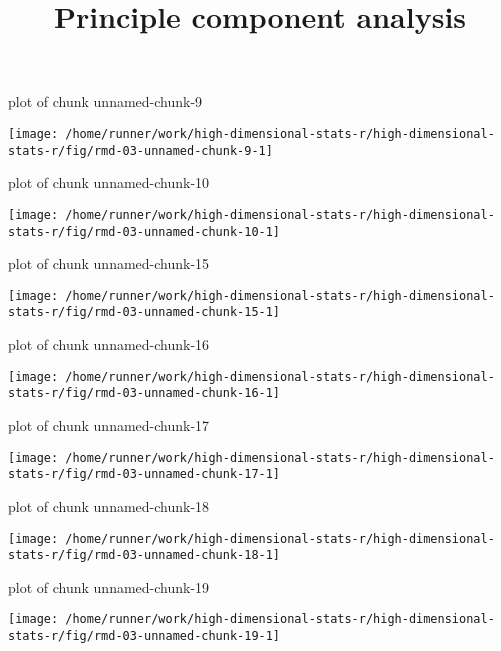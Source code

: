 \documentclass[ignorenonframetext,]{beamer}
\title{Principle component analysis}
\author{}
\date{\vspace{-2.5em}}
\begin{document}
\frame{\titlepage}

\begin{frame}{plot of chunk unnamed-chunk-9}
\protect\hypertarget{plot-of-chunk-unnamed-chunk-9}{}

\texttt{[image: /home/runner/work/high-dimensional-stats-r/high-dimensional-stats-r/fig/rmd-03-unnamed-chunk-9-1]}



\end{frame}

\begin{frame}{plot of chunk unnamed-chunk-10}
\protect\hypertarget{plot-of-chunk-unnamed-chunk-10}{}

\texttt{[image: /home/runner/work/high-dimensional-stats-r/high-dimensional-stats-r/fig/rmd-03-unnamed-chunk-10-1]}



\end{frame}

\begin{frame}{plot of chunk unnamed-chunk-15}
\protect\hypertarget{plot-of-chunk-unnamed-chunk-15}{}

\texttt{[image: /home/runner/work/high-dimensional-stats-r/high-dimensional-stats-r/fig/rmd-03-unnamed-chunk-15-1]}



\end{frame}

\begin{frame}{plot of chunk unnamed-chunk-16}
\protect\hypertarget{plot-of-chunk-unnamed-chunk-16}{}

\texttt{[image: /home/runner/work/high-dimensional-stats-r/high-dimensional-stats-r/fig/rmd-03-unnamed-chunk-16-1]}



\end{frame}

\begin{frame}{plot of chunk unnamed-chunk-17}
\protect\hypertarget{plot-of-chunk-unnamed-chunk-17}{}

\texttt{[image: /home/runner/work/high-dimensional-stats-r/high-dimensional-stats-r/fig/rmd-03-unnamed-chunk-17-1]}



\end{frame}

\begin{frame}{plot of chunk unnamed-chunk-18}
\protect\hypertarget{plot-of-chunk-unnamed-chunk-18}{}

\texttt{[image: /home/runner/work/high-dimensional-stats-r/high-dimensional-stats-r/fig/rmd-03-unnamed-chunk-18-1]}



\end{frame}

\begin{frame}{plot of chunk unnamed-chunk-19}
\protect\hypertarget{plot-of-chunk-unnamed-chunk-19}{}

\texttt{[image: /home/runner/work/high-dimensional-stats-r/high-dimensional-stats-r/fig/rmd-03-unnamed-chunk-19-1]}



\end{frame}
\end{document}
